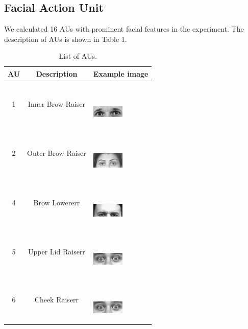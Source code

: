 \documentclass[10pt, conference, compsocconf]{IEEEtran}
\begin{document}
\subsection{Facial Action Unit}

We calculated 16 AUs with prominent facial features in the experiment. The description of AUs is shown in Table 1.

\begin{table}
	\caption{List of AUs.}
	\label{tab:freq}
	\centering
	\begin{tabular}{ccl}
		\toprule
		AU & Description & Example image\\ 
		\midrule
		1 & Inner Brow Raiser & \ \ \ \begin{minipage} {0.1\textwidth}   
			\includegraphics[width=0.6in]{AUimage/AU1.png}  
		\end{minipage}\\
		2 & Outer Brow Raiser & \ \ \ \begin{minipage} {0.1\textwidth}   
			\includegraphics[width=0.6in]{AUimage/AU2.png}  
		\end{minipage}\\
		4 & Brow Lowererr & \ \ \ \begin{minipage} {0.1\textwidth}   
			\includegraphics[width=0.6in]{AUimage/AU4.png}  
		\end{minipage}\\
		5 & Upper Lid Raiserr & \ \ \ \begin{minipage} {0.1\textwidth}   
			\includegraphics[width=0.6in]{AUimage/AU5.png}  
		\end{minipage}\\
		6 & Cheek Raiserr & \ \ \ \begin{minipage} {0.1\textwidth}   
			\includegraphics[width=0.6in]{AUimage/AU6.png}  
		\end{minipage}\\

\end{tabular}
\end{table}
\end{document}
